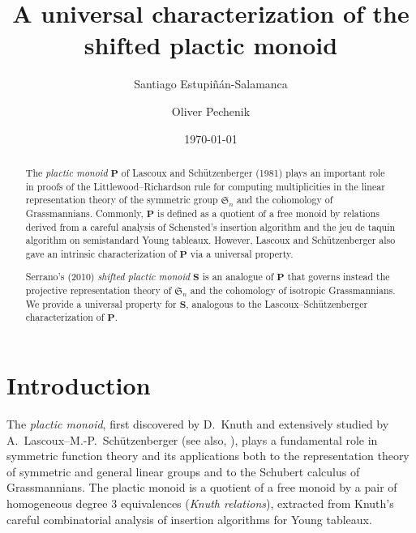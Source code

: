 \documentclass[12 pt]{amsart}
\newcommand{\Plactic}{{\mathbf{P}}}
\newcommand{\sPlactic}{\mathbf{S}}
\newcommand{\symmetricgroup}{\mathfrak{S}}
\theoremstyle{remark}
\numberwithin{equation}{section}
\begin{document}
\title{A universal characterization of the shifted plactic monoid}


\author{Santiago Estupi\~n\'an-Salamanca}
\address[SE]{Department of Combinatorics \& Optimization, University of Waterloo, Waterloo ON, Canada}
\author{Oliver Pechenik}
\address[OP]{Department of Combinatorics \& Optimization, University of Waterloo, Waterloo ON, Canada}

\date{\today}


\begin{abstract}
The \emph{plactic monoid} $\Plactic$ of Lascoux and Sch\"{u}tzenberger (1981) plays an important role in proofs of the Littlewood--Richardson rule for computing multiplicities in the linear representation theory of the symmetric group $\symmetricgroup_n$ and the cohomology of Grassmannians. Commonly, $\Plactic$ is defined as a quotient of a free monoid by relations derived from a careful analysis of Schensted's insertion algorithm and the jeu de taquin algorithm on semistandard Young tableaux. However, Lascoux and Sch\"{u}tzenberger also gave an intrinsic characterization of $\Plactic$ via a universal property.

Serrano's (2010) \emph{shifted plactic monoid} $\sPlactic$ is an analogue of $\Plactic$ that governs instead the projective representation theory of $\symmetricgroup_n$ and the cohomology of isotropic Grassmannians. We provide a universal property for $\sPlactic$, analogous to the Lascoux--Sch\"{u}tzenberger characterization of $\Plactic$.
\end{abstract}

\maketitle

\section{Introduction}

The \emph{plactic monoid}, first discovered by D.~Knuth \cite{Knuth} and extensively studied by A.~Lascoux--M.-P.~Sch\"utzenberger \cite{Lascoux.Schutzenberger:plaxique} (see also, \cite[\S 5]{Lothaire}), plays a fundamental role in symmetric function theory and its applications both to the representation theory of symmetric and general linear groups and to the Schubert calculus of Grassmannians. The plactic monoid is a quotient of a free monoid by a pair of homogeneous degree $3$ equivalences (\emph{Knuth relations}), extracted from Knuth's \cite{Knuth} careful combinatorial analysis of insertion algorithms for Young tableaux. 
\end{document}
